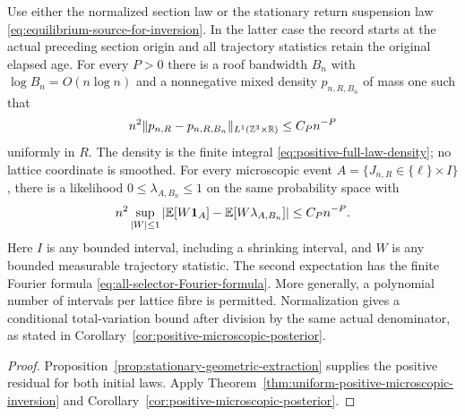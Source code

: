 \begin{maintheorem}
\label{thm:intro-positive-microscopic-conditioning}
Use either the normalized section law or the stationary return
suspension law \eqref{eq:equilibrium-source-for-inversion}. In the latter
case the record starts at the actual preceding section origin and all
trajectory statistics retain the original elapsed age.
For every $P>0$ there is a roof bandwidth $B_n$ with
$\log B_n=O(n\log n)$ and a nonnegative mixed density $p_{n,R,B_n}$
of mass one such that
\[
 n^2\|p_{n,R}-p_{n,R,B_n}\|_{L^1(\mathbb Z^3\times\mathbb R)}\le C_Pn^{-P}
\]
uniformly in $R$. The density is the finite integral
\eqref{eq:positive-full-law-density}; no lattice coordinate is smoothed.
For every microscopic event $A=\{J_{n,R}\in\{\ell\}\times I\}$, there
is a likelihood $0\le\lambda_{A,B_n}\le1$ on the same probability
space with
\[
 n^2\sup_{|W|\le1}
 \left|\mathbb E[W\mathbf1_A]-\mathbb E[W\lambda_{A,B_n}]\right|
        \le C_Pn^{-P}.
\]
Here $I$ is any bounded interval, including a shrinking interval, and
$W$ is any bounded measurable trajectory statistic. The second
expectation has the finite Fourier formula
\eqref{eq:all-selector-Fourier-formula}. More generally, a polynomial
number of intervals per lattice fibre is permitted. Normalization gives
a conditional total-variation bound after division by the same actual
denominator, as stated in Corollary~\ref{cor:positive-microscopic-posterior}.
\end{maintheorem}
\begin{proof}
Proposition~\ref{prop:stationary-geometric-extraction} supplies the
positive residual for both initial laws. Apply
Theorem~\ref{thm:uniform-positive-microscopic-inversion} and
Corollary~\ref{cor:positive-microscopic-posterior}.
\end{proof}

